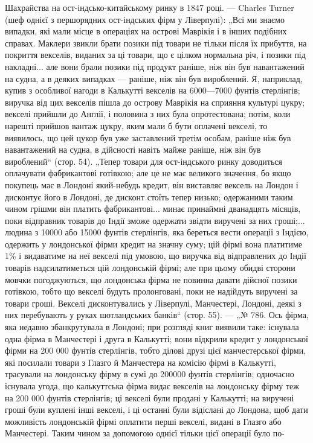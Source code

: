 Шахрайства на ост-індсько-китайському ринку в 1847 році. — Charles
Turner (шеф однієї з першорядних ост-індських фірм у Ліверпулі): „Всі ми
знаємо випадки, які мали місце в операціях на острові Маврікія і в інших
подібних справах. Маклери звикли брати позики під товари не тільки після
їх прибуття, на покриття векселів, виданих за ці товари, що є цілком нормальна річ, і позики під
накладні... але вони брали позики під продукт раніше,
ніж він був навантажений на судна, а в деяких випадках — раніше, ніж він був
вироблений. Я, наприклад, купив з особливої нагоди в Калькутті векселів на 6000—7000 фунтів
стерлінгів; виручка від цих векселів пішла до острову Маврікія
на сприяння культурі цукру; векселі прийшли до Англії, і половина з них була
опротестована; потім, коли нарешті прийшов вантаж цукру, яким мали б бути
оплачені векселі, то виявилось, що цей цукор був уже заставлений третім особам,
раніше ніж був навантажений на судна, в дійсності навіть майже раніше, ніж він
був вироблений“ (стор. 54). „Тепер товари для ост-індського ринку доводиться
оплачувати фабрикантові готівкою; але це не має великого значення, бо якщо покупець має в Лондоні
який-небудь кредит, він виставляє вексель на Лондон
і дисконтує його в Лондоні, де дисконт стоїть тепер низько; одержаними таким
чином грішми він платить фабрикантові... минає принаймні дванадцять місяців,
поки відправник товарів до Індії зможе одержати звідти виручені за них гроші;...
людина з 10000 або 15000 фунтів стерлінгів, яка береться вести операції з Індією, одержить у
лондонської фірми кредит на значну суму; цій фірмі вона платитиме 1\% і видаватиме на неї векселі під
умовою, що виручка від відправлених до
Індії товарів надсилатиметься цій лондонській фірмі; але при цьому обидві сторони мовчки
погоджуються, що лондонська фірма не повинна давати дійсної
позики готівкою, тобто що векселі будуть пролонговані, поки не надійдуть виручені за товари гроші.
Векселі дисконтувались у Ліверпулі, Манчестері, Лондоні, деякі з них перебувають у руках
шотландських банків“ (стор. 55). — „№ 786.
Ось фірма, яка недавно збанкрутувала в Лондоні; при розгляді книг виявили таке:
існувала одна фірма в Манчестері і друга в Калькутті; вони відкрили кредит
у лондонської фірми на 200 000 фунтів стерлінгів, тобто ділові друзі цієї манчестерської фірми, які
посилали товари з Глазго й Манчестера на комісію фірмі в Калькутті, трасували на лондонську фірму в
сумі до 200000 фунтів стерлінгів; одночасно існувала угода, що калькуттська фірма видає векселів на
лондонську фірму теж на 200 000 фунтів стерлінгів; ці векселі були продані у Калькутті; на виручені
гроші були куплені інші векселі, і ці останні були відіслані до Лондона,
щоб дати можливість лондонській фірмі оплатити перші векселі, видані в Глазго
або Манчестері. Таким чином за допомогою однієї тільки цієї операції було по-
